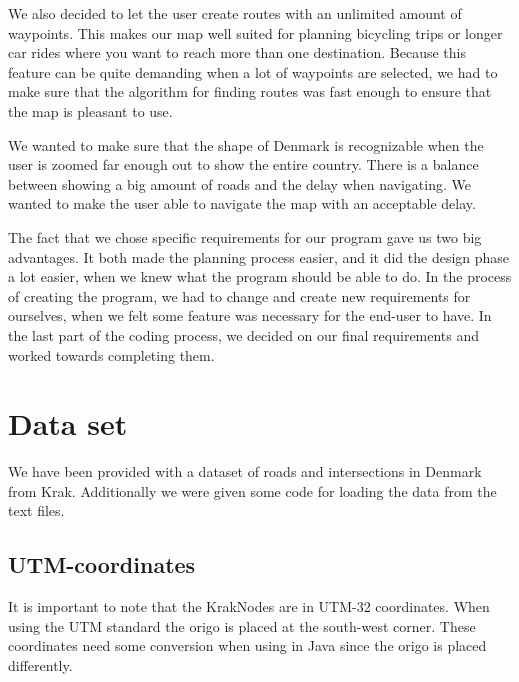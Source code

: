 We also decided to let the user create routes with an unlimited amount of
waypoints. This makes our map well suited for planning bicycling trips or longer
car rides where you want to reach more than one destination. Because this
feature can be quite demanding when a lot of waypoints are selected, we had to
make sure that the algorithm for finding routes was fast enough to ensure that the 
map is pleasant to use.

We wanted to make sure that the shape of Denmark is recognizable when
the user is zoomed far enough out to show the entire country. There is a balance between
showing a big amount of roads and the delay when navigating. We wanted to make
the user able to navigate the map with an acceptable delay. 

The fact that we chose specific requirements for our program gave us two big
advantages. It both made the planning process easier, and it did the design phase a lot 
easier, when we knew what the program should be able to do. In the process of creating the
program, we had to change and create new requirements for ourselves, when we
felt some feature was necessary for the end-user to have. In the last part of
the coding process, we decided on our final requirements and worked towards completing them. 

\section{Data set}
\label{BG-DS}
We have been provided with a dataset of roads and intersections in Denmark 
from Krak. Additionally we were given some code for loading the data from the 
text files.

\subsection{UTM-coordinates}
\label{BG-DS-UTM}
It is important to note that the KrakNodes are in UTM-32 coordinates. When 
using the UTM standard the origo is placed at the south-west corner. These 
coordinates need some conversion when using in Java since the origo is placed 
differently.

